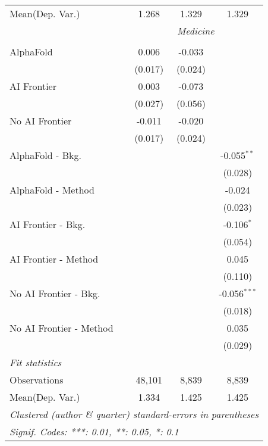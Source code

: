 \begin{tabular}{lccc}
Mean(Dep. Var.) & 1.268 & 1.329 & 1.329 \\
 & \multicolumn{3}{c}{\textit{Medicine}} \\ \\
   AlphaFold               & 0.006   & -0.033  &   \\   
                           & (0.017) & (0.024) &   \\   
   AI Frontier             & 0.003   & -0.073  &   \\   
                           & (0.027) & (0.056) &   \\   
   No AI Frontier          & -0.011  & -0.020  &   \\   
                           & (0.017) & (0.024) &   \\   
   AlphaFold - Bkg.        &         &         & -0.055$^{**}$\\   
                           &         &         & (0.028)\\   
   AlphaFold - Method      &         &         & -0.024\\   
                           &         &         & (0.023)\\   
   AI Frontier - Bkg.      &         &         & -0.106$^{*}$\\   
                           &         &         & (0.054)\\   
   AI Frontier - Method    &         &         & 0.045\\   
                           &         &         & (0.110)\\   
   No AI Frontier - Bkg.   &         &         & -0.056$^{***}$\\   
                           &         &         & (0.018)\\   
   No AI Frontier - Method &         &         & 0.035\\   
                           &         &         & (0.029)\\   
   \midrule
   \emph{Fit statistics}\\
   Observations            & 48,101  & 8,839   & 8,839\\  
Mean(Dep. Var.) & 1.334 & 1.425 & 1.425 \\
   \midrule \midrule
   \multicolumn{4}{l}{\emph{Clustered (author \& quarter) standard-errors in parentheses}}\\
   \multicolumn{4}{l}{\emph{Signif. Codes: ***: 0.01, **: 0.05, *: 0.1}}\\
\end{tabular}
\par\endgroup
